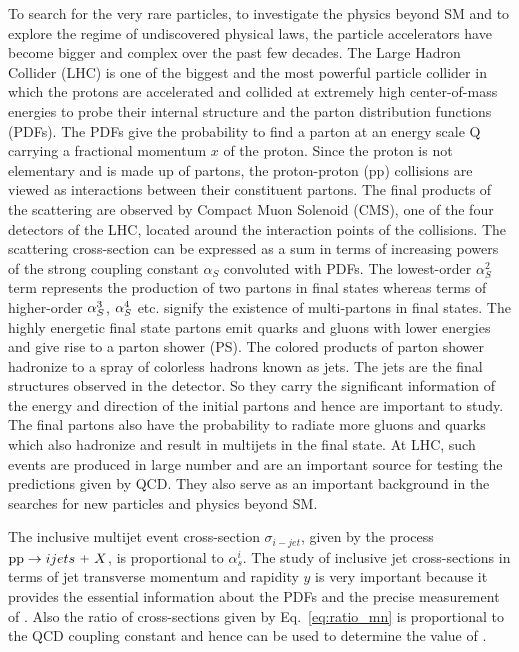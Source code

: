 To search for the very rare particles, to investigate the physics beyond SM and to explore the regime of undiscovered physical laws, the particle accelerators have become bigger and complex over the past few decades. The Large Hadron Collider (LHC) is one of the biggest and the most powerful particle collider in which the protons are accelerated and collided at extremely high center-of-mass energies to probe their internal structure and the parton distribution functions (PDFs). The PDFs give the probability to find a parton at an energy scale Q carrying a fractional momentum $x$ of the proton. Since the proton is not elementary and is made up of partons, the proton-proton (pp) collisions are viewed as interactions between their constituent partons. The final products of the scattering are observed by Compact Muon Solenoid (CMS), one of the four detectors of the LHC, located around the interaction points of the collisions. The scattering cross-section can be expressed as a sum in terms of increasing powers of the strong coupling constant $\alpha_{S}$ convoluted with PDFs. The lowest-order $\alpha_{S}^{2}$ term represents the production of two partons in final states whereas terms of higher-order $\alpha_S^3$, $\alpha_S^4$ etc. signify the existence of multi-partons in final states. The highly energetic final state partons emit quarks and gluons with lower energies and give rise to a parton shower (PS). The colored products of parton shower hadronize to a spray of colorless hadrons known as jets. The jets are the final structures observed in the detector. So they carry the significant information of the energy and direction of the initial partons and hence are important to study. The final partons also have the probability to radiate more gluons and quarks which also hadronize and result in multijets in the final state. At LHC, such events are produced in large number and are an important source for testing the predictions given by QCD. They also serve as an important background in the searches for new particles and physics beyond SM. 

The inclusive multijet event cross-section $\sigma_{i-jet}$, given by the process ${{\rm pp}\to i jets~\plus X}$, is proportional to $\alpha^{i}_{s}$. The study of inclusive jet cross-sections in terms of jet transverse momentum \pt and rapidity $y$ is very important because it provides the essential information about the PDFs and the precise measurement of \alps. Also the ratio of cross-sections given by Eq.~\ref{eq:ratio_mn} is proportional to the QCD coupling constant \alps and hence can be used to determine the value of \alps. 

